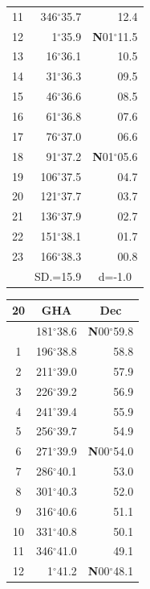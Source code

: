 \documentclass[10pt, a4paper]{report}
\begin{document}
\begin{scriptsize}
\begin{tabular*}{0.2\textwidth}[t]{@{\extracolsep{\fill}}|c|rr|}
11 & 346$^\circ$35.7 & 12.4\\[2Pt]
12 & 1$^\circ$35.9 & \textbf{N}01$^\circ$11.5\\
13 & 16$^\circ$36.1 & 10.5\\
14 & 31$^\circ$36.3 & 09.5\\
15 & 46$^\circ$36.6 & \raisebox{0.24ex}{\boldmath$\cdot$~\boldmath$\cdot$~~}08.5\\
16 & 61$^\circ$36.8 & 07.6\\
17 & 76$^\circ$37.0 & 06.6\\[2Pt]
18 & 91$^\circ$37.2 & \textbf{N}01$^\circ$05.6\\
19 & 106$^\circ$37.5 & 04.7\\
20 & 121$^\circ$37.7 & 03.7\\
21 & 136$^\circ$37.9 & \raisebox{0.24ex}{\boldmath$\cdot$~\boldmath$\cdot$~~}02.7\\
22 & 151$^\circ$38.1 & 01.7\\
23 & 166$^\circ$38.3 & 00.8\\
\hline
\rule{0pt}{2.4ex} & \multicolumn{1}{c}{SD.=15.9} & \multicolumn{1}{c|}{d=-1.0}\\
\hline
\end{tabular*}\noindent
\begin{tabular*}{0.2\textwidth}[t]{@{\extracolsep{\fill}}|c|rr|}
\hline
\multicolumn{1}{|c|}{\rule{0pt}{2.6ex}\textbf{20}} & \multicolumn{1}{c}{\textbf{GHA}} & \multicolumn{1}{c|}{\textbf{Dec}}\\
\hline\rule{0pt}{2.6ex}\noindent
0 & 181$^\circ$38.6 & \textbf{N}00$^\circ$59.8\\
1 & 196$^\circ$38.8 & 58.8\\
2 & 211$^\circ$39.0 & 57.9\\
3 & 226$^\circ$39.2 & \raisebox{0.24ex}{\boldmath$\cdot$~\boldmath$\cdot$~~}56.9\\
4 & 241$^\circ$39.4 & 55.9\\
5 & 256$^\circ$39.7 & 54.9\\[2Pt]
6 & 271$^\circ$39.9 & \textbf{N}00$^\circ$54.0\\
7 & 286$^\circ$40.1 & 53.0\\
8 & 301$^\circ$40.3 & 52.0\\
9 & 316$^\circ$40.6 & \raisebox{0.24ex}{\boldmath$\cdot$~\boldmath$\cdot$~~}51.1\\
10 & 331$^\circ$40.8 & 50.1\\
11 & 346$^\circ$41.0 & 49.1\\[2Pt]
12 & 1$^\circ$41.2 & \textbf{N}00$^\circ$48.1\\

\end{tabular*}
\end{scriptsize}
\end{document}
